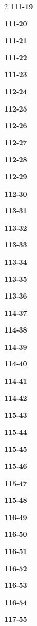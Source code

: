 \documentclass[10pt,a4paper]{article}
\begin{document}
\begin{multicols}{2}
\noindent\textbf{111-19}\ \par
\noindent\textbf{111-20}\ \par
\noindent\textbf{111-21}\ \par
\noindent\textbf{111-22}\ \par
\noindent\textbf{111-23}\ \par
\noindent\textbf{112-24}\ \par
\noindent\textbf{112-25}\ \par
\noindent\textbf{112-26}\ \par
\noindent\textbf{112-27}\ \par
\noindent\textbf{112-28}\ \par
\noindent\textbf{112-29}\ \par
\noindent\textbf{112-30}\ \par
\noindent\textbf{113-31}\ \par
\noindent\textbf{113-32}\ \par
\noindent\textbf{113-33}\ \par
\noindent\textbf{113-34}\ \par
\noindent\textbf{113-35}\ \par
\noindent\textbf{113-36}\ \par
\noindent\textbf{114-37}\ \par
\noindent\textbf{114-38}\ \par
\noindent\textbf{114-39}\ \par
\noindent\textbf{114-40}\ \par
\noindent\textbf{114-41}\ \par
\noindent\textbf{114-42}\ \par
\noindent\textbf{115-43}\ \par
\noindent\textbf{115-44}\ \par
\noindent\textbf{115-45}\ \par
\noindent\textbf{115-46}\ \par
\noindent\textbf{115-47}\ \par
\noindent\textbf{115-48}\ \par
\noindent\textbf{116-49}\ \par
\noindent\textbf{116-50}\ \par
\noindent\textbf{116-51}\ \par
\noindent\textbf{116-52}\ \par
\noindent\textbf{116-53}\ \par
\noindent\textbf{116-54}\ \par
\noindent\textbf{117-55}\ \par

\end{multicols}
\end{document}
